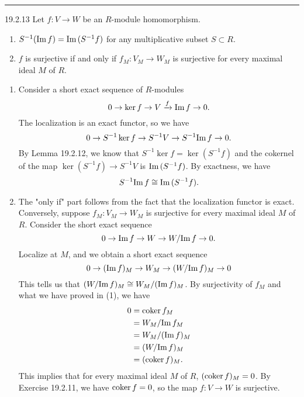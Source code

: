 \documentclass[letterpaper, 12pt]{article}
\begin{document}
\noindent\rule{7in}{2.8pt}
\begin{problem}{19.2.13}
Let \(f:V\rightarrow W\) be an \(R\)-module homomorphism. 
\begin{enumerate}[(1)]
\item \(S^{-1}(\text{Im}\, f)=\text{Im}\,(S^{-1}f)\) for any multiplicative subset \(S\subset R\). 
\item \(f\) is surjective if and only if \(f_M:V_M\rightarrow W_M\) is surjective for every maximal ideal \(M\) of \(R\).
\end{enumerate}
\end{problem}
\begin{solution}
\begin{enumerate}[(1)]
\item Consider a short exact sequence of \(R\)-modules 
\[0\rightarrow \ker f\rightarrow V\xrightarrow{f}\text{Im}\, f\rightarrow 0.\]
The localization is an exact functor, so we have 
\[0\rightarrow S^{-1}\ker f\rightarrow S^{-1}V\rightarrow S^{-1}\text{Im}\, f\rightarrow 0.\]
By Lemma 19.2.12, we know that \(S^{-1}\ker f=\ker (S^{-1}f)\) and the cokernel of the map \(\ker(S^{-1}f)\rightarrow S^{-1}V\) is \(\text{Im}\, (S^{-1}f)\). By exactness, we have 
\[S^{-1}\text{Im}\, f\cong \text{Im}\, (S^{-1}f).\]
\item The "only if" part follows from the fact that the localization functor is exact. Conversely, suppose \(f_M:V_M\rightarrow W_M\) is surjective for every maximal ideal \(M\) of \(R\). Consider the short exact sequence 
\[0\rightarrow \text{Im}\, f\rightarrow W\rightarrow W/\text{Im}\, f\rightarrow 0.\]
Localize at \(M\), and we obtain a short exact sequence
\[0\rightarrow (\text{Im}\, f)_M\rightarrow W_M\rightarrow (W/\text{Im}\, f)_M\rightarrow 0\]
This tells us that \((W/\text{Im}\, f)_M\cong W_M/(\text{Im}\, f)_M\). By surjectivity of \(f_M\) and what we have proved in (1), we have 
\begin{align*}
    0&=\text{coker}\, f_M\\ 
     &=W_M/\text{Im}\, f_M\\
     &=W_M/(\text{Im}\, f)_M\\ 
     &=(W/\text{Im}\, f)_M\\
     &=(\text{coker}\, f)_M.
\end{align*}
This implies that for every maximal ideal \(M\) of \(R\), \((\text{coker}\, f)_M=0\). By Exercise 19.2.11, we have \(\text{coker}\, f=0\), so the map \(f:V\rightarrow W\) is surjective.
\end{enumerate}
\end{solution}
\end{document}
